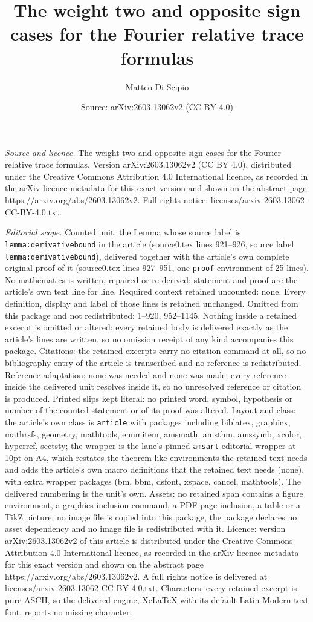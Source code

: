 \documentclass[10pt,a4paper]{amsart}
\title[The weight two and opposite sign cases for the Fourier relat]{The weight two and opposite sign cases for the Fourier relative trace formulas}
\author{Matteo Di Scipio}
\date{Source: arXiv:2603.13062v2 (CC BY 4.0)}
\begin{document}
\maketitle

\noindent\emph{Source and licence.} The weight two and opposite sign cases for the Fourier relative trace formulas. Version arXiv:2603.13062v2 (CC BY 4.0), distributed under the Creative Commons Attribution 4.0 International licence, as recorded in the arXiv licence metadata for this exact version and shown on the abstract page https://arxiv.org/abs/2603.13062v2. Full rights notice: licenses/arxiv-2603.13062-CC-BY-4.0.txt.\par\smallskip

\noindent\textit{Editorial scope.} Counted unit: the Lemma whose source label is \texttt{lemma:derivativebound} in the article (source0.tex lines 921--926, source label \texttt{lemma:derivativebound}), delivered together with the article's own complete original proof of it (source0.tex lines 927--951, one \texttt{proof} environment of 25 lines). No mathematics is written, repaired or re-derived: statement and proof are the article's own text line for line. Required context retained uncounted: none. Every definition, display and label of those lines is retained unchanged. Omitted from this package and not redistributed: 1--920, 952--1145. Nothing inside a retained excerpt is omitted or altered: every retained body is delivered exactly as the article's lines are written, so no omission receipt of any kind accompanies this package. Citations: the retained excerpts carry no citation command at all, so no bibliography entry of the article is transcribed and no reference is redistributed. Reference adaptation: none was needed and none was made; every reference inside the delivered unit resolves inside it, so no unresolved reference or citation is produced. Printed slips kept literal: no printed word, symbol, hypothesis or number of the counted statement or of its proof was altered. Layout and class: the article's own class is \texttt{article} with packages including biblatex, graphicx, mathrsfs, geometry, mathtools, enumitem, amsmath, amsthm, amssymb, xcolor, hyperref, sectsty; the wrapper is the lane's pinned \texttt{amsart} editorial wrapper at 10pt on A4, which restates the theorem-like environments the retained text needs and adds the article's own macro definitions that the retained text needs (none), with extra wrapper packages (bm, bbm, dsfont, xspace, cancel, mathtools). The delivered numbering is the unit's own. Assets: no retained span contains a figure environment, a graphics-inclusion command, a PDF-page inclusion, a table or a TikZ picture; no image file is copied into this package, the package declares no asset dependency and no image file is redistributed with it. Licence: version arXiv:2603.13062v2 of this article is distributed under the Creative Commons Attribution 4.0 International licence, as recorded in the arXiv licence metadata for this exact version and shown on the abstract page https://arxiv.org/abs/2603.13062v2. A full rights notice is delivered at licenses/arxiv-2603.13062-CC-BY-4.0.txt. Characters: every retained excerpt is pure ASCII, so the delivered engine, XeLaTeX with its default Latin Modern text font, reports no missing character.
\end{document}
